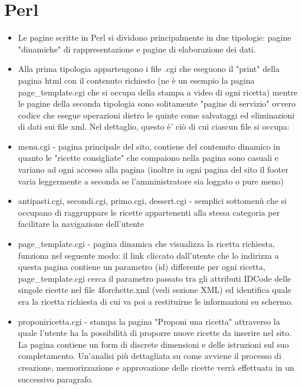 \documentclass[12pt]{article}
\begin{document}
			\section{Perl}
			\begin{itemize}
				 \item Le pagine scritte in Perl si dividono principalmente in due tipologie: pagine "dinamiche" di rappresentazione e pagine di elaborazione dei dati.
				\item Alla prima tipologia appartengono i file .cgi che eseguono il "print" della pagina html con il contenuto richiesto (ne è un esempio la pagina page\_template.cgi che si occupa della stampa a video di ogni ricetta) mentre le pagine della seconda tipologia sono solitamente "pagine di servizio" ovvero codice che esegue operazioni dietro le quinte come salvataggi ed eliminazioni di dati sui file xml. Nel dettaglio, questo \`e' ciò di cui ciascun file si occupa:


				\item  menu.cgi - pagina principale del sito, contiene del contenuto dinamico in quanto le "ricette consigliate" che compaiono nella pagina sono casuali e variano ad ogni accesso alla pagina (inoltre in ogni pagina del sito il footer varia leggermente a seconda se l'amministratore sia loggato o pure meno)
				
				\item  antipasti.cgi, secondi.cgi, primo.cgi, dessert.cgi - semplici sottomenù che si occupano di raggruppare le ricette appartenenti alla stessa categoria per facilitare la navigazione dell'utente

				\item page\_template.cgi - pagina dinamica che visualizza la ricetta richiesta, funziona nel seguente modo: il link cliccato dall'utente che lo indirizza a questa pagina contiene un parametro (id) differente per ogni ricetta, page\_template.cgi cerca il parametro passato tra gli attributi IDCode delle singole ricette nel file 4forchette.xml (vedi sezione XML) ed identifica quale era la ricetta richiesta di cui va poi a restituirne le informazioni su schermo.

				\item proponiricetta.cgi - stampa la pagina "Proponi una ricetta" attraverso la quale l'utente ha la possibilità di proporre nuove ricette da inserire nel sito. La pagina contiene un form di discrete dimensioni e delle istruzioni sul suo completamento. Un'analisi più dettagliata su come avviene il processo di creazione, memorizzazione e approvazione delle ricette verrà effettuata in un successivo paragrafo.



\end{itemize}
\end{document}
